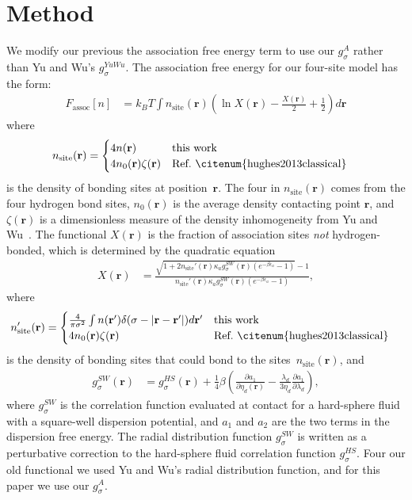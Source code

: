 \documentclass[twocolumn,amsmath,amssymb,prl]{revtex4-1}
\newcommand{\rr}{\textbf{r}}
\newcommand{\xx}{\textbf{r}}
\newcommand\etadisp{\ensuremath{\eta_\textit{d}}}
\newcommand\epsilonassoc{\ensuremath{\epsilon_\textit{a}}}
\newcommand\kappaassoc{\ensuremath{\kappa_\textit{a}}}
\newcommand\lambdadisp{\ensuremath{\lambda_\textit{d}}}
\begin{document}
\section{Method}

We modify our previous the association free energy term to use our
$g_{\sigma}^A$ rather than Yu and Wu's $g_\sigma^{YuWu}$.  The
association free energy for our four-site model has the form:
\begin{align}
  F_\text{assoc}[n] &= k_BT \int n_\text{site}(\xx)
  \left(\ln X(\xx) - \frac{X(\xx)}{2} + \frac12\right) d\xx
\end{align}
where
\begin{align}
  n_\text{site}(\rr) &=
  \begin{cases}
    4 n(\rr) & \text{this work}\\
    4 n_0(\rr) \zeta(\rr) & \text{Ref.~\citenum{hughes2013classical}}
  \end{cases} 
\end{align}
is the density of bonding sites at position~$\rr$.  The four in
$n_\text{site}(\rr)$ comes from the four hydrogen bond sites,
$n_0(\rr)$ is the average density contacting point $\rr$, and
$\zeta(\xx)$ is a dimensionless measure of the density inhomogeneity
from Yu and Wu~\cite{yu2002fmt-dft-inhomogeneous-associating}.  The
functional $X(\rr)$ is the fraction of association sites \emph{not}
hydrogen-bonded, which is determined by the quadratic equation
\begin{align}
  X(\xx) &= \frac{\sqrt{1 + 2n_\text{site}'(\rr)
      \kappaassoc g^\textit{SW}_\sigma(\xx)
  \left(e^{-\beta\epsilonassoc} - 1\right)} - 1}
  {n_\text{site}'(\rr)
    \kappaassoc g^\textit{SW}_\sigma(\xx)
  \left(e^{-\beta\epsilonassoc} - 1\right)}, \label{eq:X}
\end{align}
where
\begin{align}
  n_\text{site}'(\rr) &=
  \begin{cases}
    \frac{4}{\pi\sigma^2} \int n(\rr')\delta(\sigma - |\rr-\rr'|) d\rr' & \text{this work}\\
    4 n_0(\rr) \zeta(\rr) & \text{Ref.~\citenum{hughes2013classical}}
  \end{cases} 
\end{align}
is the density of bonding sites that could bond to the sites~$n_\text{site}(\rr)$, and
\begin{align}
  g^\textit{SW}_\sigma(\xx) &= g^\textit{HS}_\sigma(\xx) +
  \frac{1}{4}\beta\left(\frac{\partial a_1}{\partial \etadisp(\xx)} -
  \frac{\lambdadisp}{3 \etadisp}\frac{\partial a_1}{\partial \lambdadisp}\right)\label{eq:gSW},
\end{align}
where $g^\textit{SW}_\sigma$ is the correlation function evaluated at
contact for a hard-sphere fluid with a square-well dispersion
potential, and $a_1$ and $a_2$ are the two terms in the dispersion
free energy.  The radial distribution function $g^\textit{SW}_\sigma$ is
written as a perturbative correction to the hard-sphere fluid
correlation function $g^\textit{HS}_\sigma$. Four our old functional
we used Yu and Wu's radial distribution function, and for this paper we
use our $g^\textit{A}_\sigma$.
\end{document}
